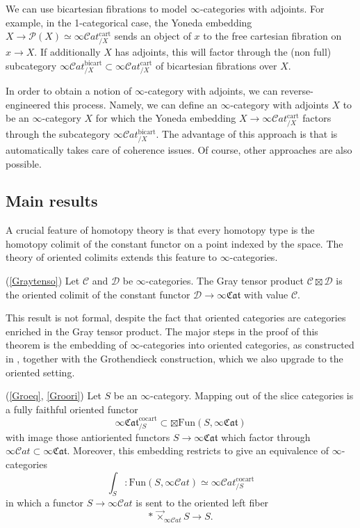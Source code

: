\documentclass[10pt,oneside]{article}
\numberwithin{equation}{section} %
\numberwithin{figure}{section} %
\theoremstyle{plain}
\theoremstyle{definition}
\newcommand{\mC}{{\mathcal C}}
\newcommand{\mD}{{\mathcal D}}
\newcommand{\mP}{{\mathcal P}}
\newcommand{\Fun}{\mathrm{Fun}}
\newcommand{\cocart}{{\mathrm{cocart}}}
\newcommand{\cart}{{\mathrm{cart}}}
\newcommand{\bicart}{{\mathrm{bicart}}}
\newcommand{\scat}{\mathcal{C}\mathit{at}}
\newcommand{\fcat}{\mathfrak{Cat}}
\begin{document}
We can use bicartesian fibrations to model $\infty$-categories with adjoints.
For example, in the 1-categorical case, the Yoneda embedding $X\to\mP(X)\simeq\infty\scat_{/X}^\cart$ sends an object of $x$ to the free cartesian fibration on $x\to X$.
If additionally $X$ has adjoints, this will factor through the (non full) subcategory $\infty\scat_{/X}^{\mathrm{bicart}}\subset\infty\scat_{/X}^{\cart}$ of bicartesian fibrations over $X$.

In order to obtain a notion of $\infty$-category with adjoints, we can reverse-engineered this process.
Namely, we can define an $\infty$-category with adjoints $X$ to be an $\infty$-category $X$ for which the Yoneda embedding $X\to\infty\scat_{/X}^\cart$ factors through the subcategory $\infty\scat^{\bicart}_{/X}$.
The advantage of this approach is that is automatically takes care of coherence issues.
Of course, other approaches are also possible.

\subsection{Main results}



A crucial feature of homotopy theory is that every homotopy type is the homotopy colimit of the constant functor on a point indexed by the space.
The theory of oriented colimits extends this feature to $\infty$-categories.

\begin{theorem}(\cref{Graytenso})
Let $\mC$ and $\mD$ be $\infty$-categories. The Gray tensor product $\mC\boxtimes\mD$ is the oriented colimit of the constant functor $\mD\to\infty\fcat$ with value $\mC$.
\end{theorem}

This result is not formal, despite the fact that oriented categories are categories enriched in the Gray tensor product.
The major steps in the proof of this theorem is the embedding of $\infty$-categories into oriented categories, as constructed in \cite{oriented}, together with the Grothendieck construction, which we also upgrade to the oriented setting.

\begin{theorem}\label{THH1}(\cref{Groeq}, \cref{Groori})
Let $S$ be an $\infty$-category.
Mapping out of the slice categories is a fully faithful oriented functor
$$\infty\fcat_{/S}^\cocart\subset\boxtimes\Fun(S,\infty\fcat)$$
with image those antioriented functors $S\to\infty\fcat$ which factor through $\infty\scat\subset\infty\fcat$.
Moreover, this embedding restricts to give an equivalence of $\infty$-categories
\[
\int_S: \Fun(S,\infty\scat)\simeq\infty\scat_{/S}^\cocart
\]
in which a functor $S\to\infty\scat$ is sent to the oriented left fiber
\[
* \,{\vec{\times}}_{\infty\scat} S \to S.
\]
\end{theorem}
\end{document}
